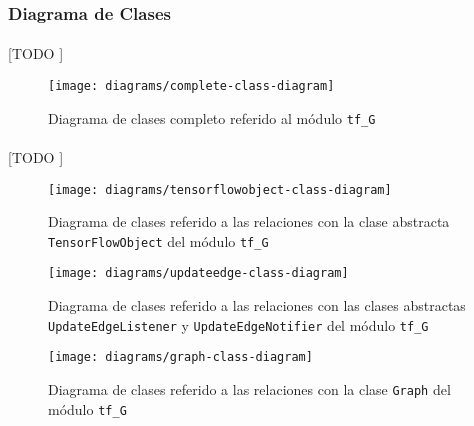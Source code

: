 \documentclass{subfiles}
\begin{document}
        \subsubsection{Diagrama de Clases}
        \label{sec:class_diagram}

          \paragraph{}
          [TODO ]

          \begin{figure}[h]
            \centering
            \texttt{[image: diagrams/complete-class-diagram]}
            \caption{Diagrama de clases completo referido al módulo \texttt{tf\_G}}
            \label{img:class_diagram}
          \end{figure}

          \paragraph{}
          [TODO ]

          \begin{figure}[h]
            \centering
            \texttt{[image: diagrams/tensorflowobject-class-diagram]}
            \caption{Diagrama de clases referido a las relaciones con la clase abstracta \texttt{TensorFlowObject} del módulo \texttt{tf\_G}}
            \label{img:tensorflowobject_class_diagram}
          \end{figure}

          \begin{figure}[h]
            \centering
            \texttt{[image: diagrams/updateedge-class-diagram]}
            \caption{Diagrama de clases referido a las relaciones con las clases abstractas \texttt{UpdateEdgeListener} y \texttt{UpdateEdgeNotifier} del módulo \texttt{tf\_G}}
            \label{img:update_edge_diagram}
          \end{figure}

          \begin{figure}[h]
            \centering
            \texttt{[image: diagrams/graph-class-diagram]}
            \caption{Diagrama de clases referido a las relaciones con la clase \texttt{Graph} del módulo \texttt{tf\_G}}
            \label{img:graph_class_diagram}
          \end{figure}
\end{document}
